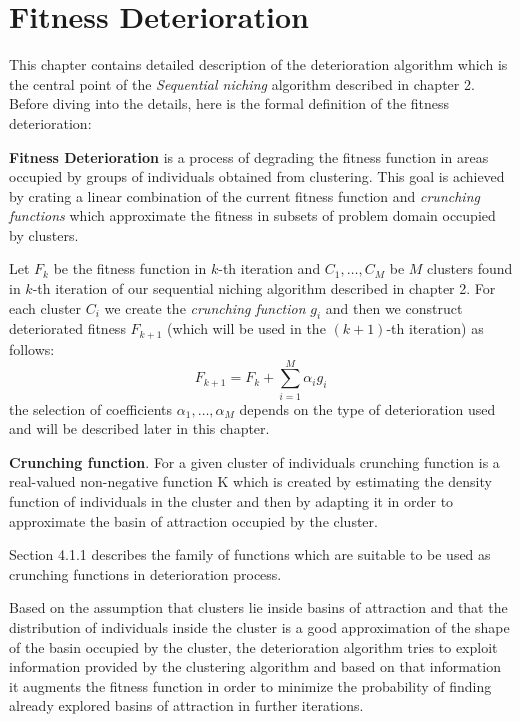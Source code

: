 

\chapter{Fitness Deterioration}
\label{FitnessDeterioration}

This chapter contains detailed description of the deterioration algorithm
which is the central point of the \textit{Sequential niching} algorithm
described in chapter 2. Before diving into
the details, here is the formal definition of the fitness deterioration:

\begin{definition} \label{def:fitness-deterioration}
\textbf{Fitness Deterioration} is a process of degrading the fitness
function in areas occupied by groups of individuals obtained from
clustering. This goal is achieved by crating a linear combination of the 
current fitness function and \textit{crunching functions} which approximate
the fitness in subsets of problem domain occupied by clusters.

Let $F_k$ be the fitness function in $k$-th iteration and $C_1, \ldots, C_M$ be
$M$ clusters found in $k$-th iteration of our sequential niching algorithm described in chapter 2.
For each cluster $C_i$ we create the \textit{crunching function} $g_i$ and then
we construct deteriorated fitness $F_{k+1}$ (which will be used in the
$(k+1)$-th iteration) as follows:
\begin{equation}
F_{k+1}=F_k + \sum_{i=1}^M \alpha_i g_i
\end{equation}
the selection of coefficients $\alpha_1, \ldots, \alpha_M$ depends on the
type of deterioration used and will be described later in this chapter.
\end{definition} 

\begin{definition} \label{def:crunching-function}
\textbf{Crunching function}. For a given cluster of individuals crunching
function is a real-valued non-negative function K which is created by estimating
the density function of individuals in the cluster and then by adapting it 
in order to approximate the basin of attraction occupied by the cluster.
\end{definition} 
Section 4.1.1 describes the family of functions which are suitable
to be used as crunching functions in deterioration process.

Based on the assumption that clusters lie inside basins
of attraction and that the distribution of individuals inside the cluster
is a good approximation of the shape of the basin occupied by the cluster,
the deterioration algorithm tries to exploit information
provided by the clustering algorithm and based 
on that information it augments the fitness function in order to minimize 
the probability of finding already explored basins of attraction in further iterations.

